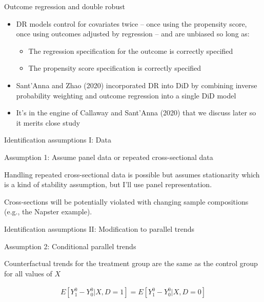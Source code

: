\documentclass{beamer}
\begin{document}
\begin{frame}{Outcome regression and double robust}

\begin{itemize}
\item DR models control for covariates twice -- once using the propensity score, once using outcomes adjusted by regression -- and are unbiased so long as:
	\begin{itemize}
	\item The regression specification for the outcome is correctly specified
	\item The propensity score specification is correctly specified
	\end{itemize}
\item Sant'Anna and Zhao (2020) incorporated DR into DiD by combining inverse probability weighting and outcome regression into a single DiD model
\item It's in the engine of Callaway and Sant'Anna (2020) that we discuss later so it merits close study
\end{itemize}

\end{frame}




\begin{frame}{Identification assumptions I: Data}

Assumption 1: Assume panel data or repeated cross-sectional data

\bigskip

Handling repeated cross-sectional data is possible but assumes stationarity which is a kind of stability assumption, but I'll use panel representation.

\bigskip

Cross-sections will be potentially violated with changing sample compositions (e.g., the Napster example).

\end{frame}

\begin{frame}{Identification assumptions II: Modification to parallel trends}

Assumption 2: Conditional parallel trends

\bigskip

Counterfactual trends for the treatment group are the same as the control group for all values of $X$

\begin{eqnarray*}
E[Y_1^0 - Y_0^0 | X, D=1] = E[Y^0_1 - Y^0_0 | X, D=0]
\end{eqnarray*}

\end{frame}
\end{document}
